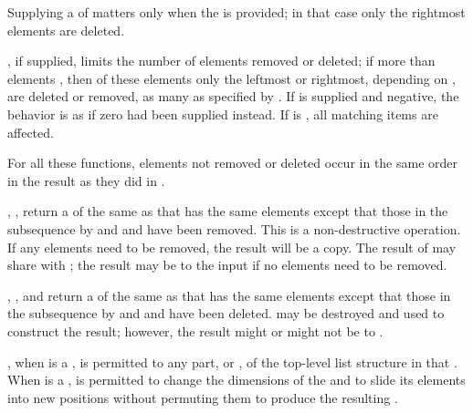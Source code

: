 Supplying a  of  matters only when the
 is provided; in that case only the rightmost  elements 
 are deleted.

, if supplied, limits the number of elements
removed or deleted; if more than  elements ,
then of these elements only the leftmost or rightmost, depending on
,
are deleted or removed,
as many as specified by .
If  is supplied and negative, 
the behavior is as if zero had been supplied instead.
If  is \nil, all matching items are affected.

For all these functions,
elements 
not removed or deleted occur in the same order in the result
as they did in .

, ,  return
a 
of the same  as 
that has the same elements except that those in the subsequence
 by  and  and 
have been removed.  
This is a non-destructive operation. If any
elements need to be removed, the result will be a copy.
The result of  may share
with ; 
the result may be  to the input 
if no elements need to be removed.

, , and 
return a  
of the same  as 
that has the same elements except that those in the subsequence
 by  and  and 
have been deleted. 
 may be destroyed and used to construct
the result; however, the result might or might not be  
to .

, when  is a , is permitted to 
 any part,  or , of the
top-level list structure in that .
When  is a ,   is 
permitted to change the dimensions of the  
and to slide its elements into new positions without
permuting them to produce the resulting .

